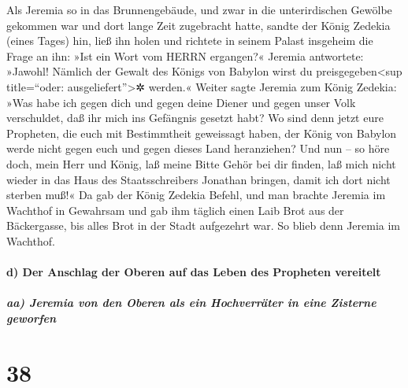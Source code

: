 Als Jeremia so in das Brunnengebäude, und zwar in die
unterirdischen Gewölbe gekommen war und dort lange Zeit zugebracht
hatte, sandte der König Zedekia (eines Tages) hin, ließ
ihn holen und richtete in seinem Palast insgeheim die Frage an ihn: »Ist
ein Wort vom HERRN ergangen?« Jeremia antwortete: »Jawohl! Nämlich der
Gewalt des Königs von Babylon wirst du preisgegeben\textless sup
title=``oder: ausgeliefert''\textgreater✲ werden.« Weiter
sagte Jeremia zum König Zedekia: »Was habe ich gegen dich und gegen
deine Diener und gegen unser Volk verschuldet, daß ihr mich ins
Gefängnis gesetzt habt? Wo sind denn jetzt eure
Propheten, die euch mit Bestimmtheit geweissagt haben, der König von
Babylon werde nicht gegen euch und gegen dieses Land heranziehen?
Und nun -- so höre doch, mein Herr und König, laß meine
Bitte Gehör bei dir finden, laß mich nicht wieder in das Haus des
Staatsschreibers Jonathan bringen, damit ich dort nicht sterben muß!«
Da gab der König Zedekia Befehl, und man brachte Jeremia
im Wachthof in Gewahrsam und gab ihm täglich einen Laib Brot aus der
Bäckergasse, bis alles Brot in der Stadt aufgezehrt war. So blieb denn
Jeremia im Wachthof.

\hypertarget{d-der-anschlag-der-oberen-auf-das-leben-des-propheten-vereitelt}{%
\paragraph{d) Der Anschlag der Oberen auf das Leben des Propheten
vereitelt}\label{d-der-anschlag-der-oberen-auf-das-leben-des-propheten-vereitelt}}

\hypertarget{aa-jeremia-von-den-oberen-als-ein-hochverruxe4ter-in-eine-zisterne-geworfen}{%
\subparagraph{aa) Jeremia von den Oberen als ein Hochverräter in eine
Zisterne
geworfen}\label{aa-jeremia-von-den-oberen-als-ein-hochverruxe4ter-in-eine-zisterne-geworfen}}

\hypertarget{section-37}{%
\section{38}\label{section-37}}

